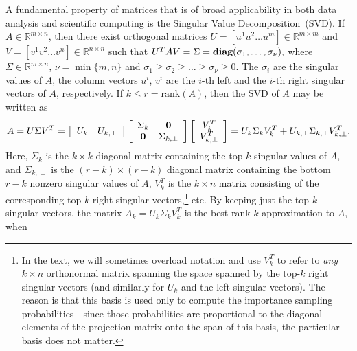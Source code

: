 \documentclass[twoside]{article}
\def\diag{\hbox{\bf{diag}}}
\begin{document}
A fundamental property of matrices that is of broad applicability in both 
data analysis and scientific computing is the Singular Value 
Decomposition~(SVD).
If $A \in \mathbb{R}^{m \times n}$, then there exist orthogonal matrices
$ U=[u^{1} u^{2} \ldots u^{m}]\in \mathbb{R}^{m \times m} $ and 
$ V=[v^{1} v^{2} \ldots v^{n}]\in \mathbb{R}^{n \times n} $
such that
$
U^TAV=\Sigma=\diag(\sigma_1,\ldots,\sigma_\nu)    ,
$
where $\Sigma \in \mathbb{R}^{m \times n}$, $\nu=\min\{m,n\}$ and 
$\sigma_1 \geq \sigma_2 \geq \ldots \geq \sigma_\nu \geq 0$.  
The $\sigma_i$ are the singular values of $A$, the column vectors $u^{i}$, $v^{i}$ 
are the $i$-th left and the $i$-th right singular vectors of $A$, 
respectively.
If $k \leq r = \mbox{rank}(A)$, then the SVD of $A$ may be written as
\begin{equation} 
\label{eqn:svdA}
A = U \Sigma V^T 
  = \left[\begin{array}{cc} 
          U_{k} & U_{k,\perp}
    \end{array}\right]
    \left[\begin{array}{cc}
          \Sigma_{k} & \bf{0}        \\
          \bf{0} & \Sigma_{k,\perp}
    \end{array}\right]
    \left[\begin{array}{c}
           V_{k}^T \\
           V_{k,\perp}^T
    \end{array}\right]     
  = U_k \Sigma_k V_k^T + U_{k,\perp} \Sigma_{k,\perp} V_{k,\perp}^T     .
\end{equation}
Here, $\Sigma_k$ is the $k \times k$ diagonal matrix containing the top $k$ 
singular values of $A$, and
$\Sigma_{k,\perp}$ is the $\left(r-k\right) \times \left(r - k\right)$ 
diagonal matrix containing the bottom $r-k$ nonzero singular values of $A$, 
$V_k^T$ is the $k \times n$ matrix consisting of the corresponding top $k$
right singular vectors,\footnote{In the text, we will sometimes overload notation and use $V_k^T$ 
to refer to \emph{any} $k \times n$ orthonormal matrix spanning the space 
spanned by the top-$k$ right singular vectors (and similarly for $U_k$ and 
the left singular vectors).  The reason is that this basis is used only to 
compute the importance sampling probabilities---since those probabilities 
are proportional to the diagonal elements of the projection matrix onto the 
span of this basis, the particular basis does not matter.}
etc.
By keeping just the top $k$ singular vectors, the matrix 
$A_k = U_k \Sigma_k V_k^T$ is the best rank-$k$ approximation to $A$, when 
\end{document}
